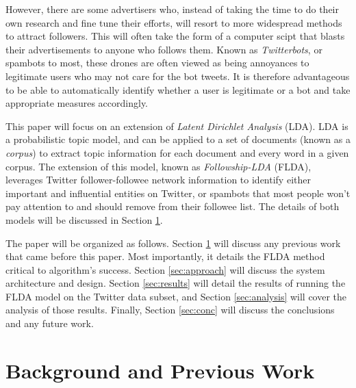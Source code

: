 \documentclass[a4paper]{article}
\begin{document}
However, there are some advertisers who, instead of taking the time to do their own research and fine tune their efforts, will resort to more widespread methods to attract followers. This will often take the form of a computer scipt that blasts their advertisements to anyone who follows them. Known as \textit{Twitterbots}, or spambots to most, these drones are often viewed as being annoyances to legitimate users who may not care for the bot tweets. It is therefore advantageous to be able to automatically identify whether a user is legitimate or a bot and take appropriate measures accordingly.

This paper will focus on an extension of \textit{Latent Dirichlet Analysis} (LDA). LDA is a probabilistic topic model, and can be applied to a set of documents (known as a \textit{corpus}) to extract topic information for each document and every word in a given corpus. The extension of this model, known as \textit{Followship-LDA} (FLDA), leverages Twitter follower-followee network information to identify either important and influential entities on Twitter, or spambots that most people won't pay attention to and should remove from their followee list. The details of both models will be discussed in Section \ref{sec:prevwork}.

The paper will be organized as follows. Section \ref{sec:prevwork} will discuss any previous work that came before this paper. Most importantly, it details the FLDA method critical to algorithm's success. Section \ref{sec:approach} will discuss the system architecture and design. Section \ref{sec:results} will detail the results of running the FLDA model on the Twitter data subset, and Section \ref{sec:analysis} will cover the analysis of those results. Finally, Section \ref{sec:conc} will discuss the conclusions and any future work.



\section{Background and Previous Work}
\label{sec:prevwork}
\end{document}
